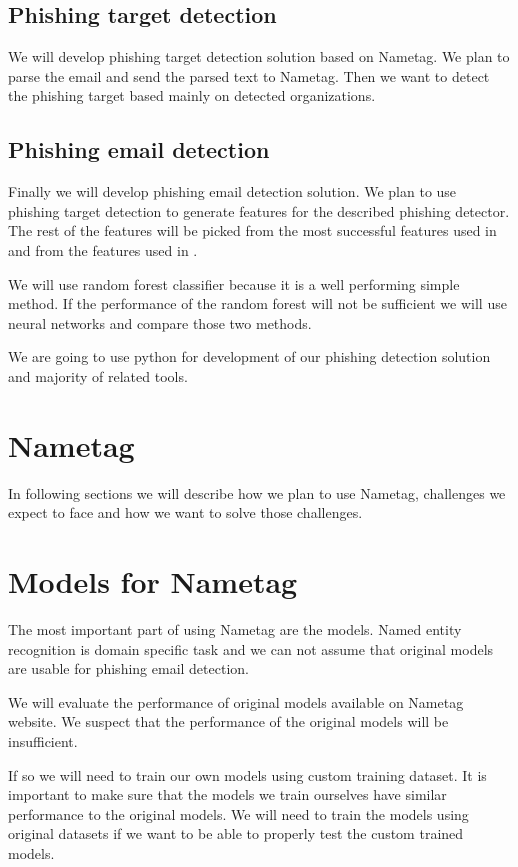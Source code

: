 \documentclass[thesis=B,english]{FITthesis}[2012/10/20]
\begin{document}
\subsection{Phishing target detection}
\par We will develop phishing target detection solution based on Nametag. We plan to parse the email and send the parsed text to Nametag. Then we want to detect the phishing target based mainly on detected organizations.


\subsection{Phishing email detection}
\par Finally we will develop phishing email detection solution.
We plan to use phishing target detection to generate features for the described phishing detector.
The rest of the features will be picked from the most successful features used in \cite{ultimateFeatureBreakdown} and from the features used in \cite{vitListik2015detekce}.

\par We will use random forest classifier because it is a well performing simple method. If the performance of the random forest will not be sufficient we will use neural networks and compare those two methods. 
\par We are going to use python \cite{python} for development of our phishing detection solution and majority of related tools.

\section{Nametag}
In following sections we will describe how we plan to use Nametag, challenges we expect to face and how we want to solve those challenges.

\section{Models for Nametag}
The most important part of using Nametag are the models. Named entity recognition is domain specific task and we can not assume that original models are usable for phishing email detection.  
\par We will evaluate the performance of original models available on Nametag website. \cite{nametagWebsite} We suspect that the performance of the original models will be insufficient.
\par If so we will need to train our own models using custom training dataset. It is important to make sure that the models we train ourselves have similar performance to the original models. We will need to train the models using original datasets if we want to be able to properly test the custom trained models.
\end{document}
